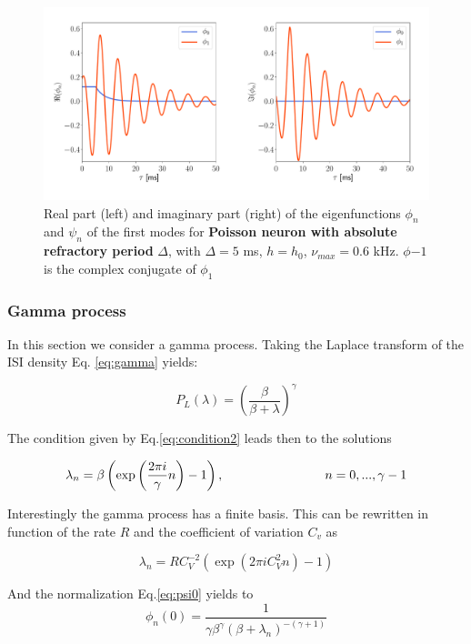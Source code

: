 \documentclass[12pt,twoside]{report}
\begin{document}
\begin{figure}[h!]
	\centering
	\includegraphics[width=0.8\linewidth]{poisson_eigenfunction2.pdf}
	\caption{Real part (left) and imaginary part (right) of the eigenfunctions $\phi_n$ and $\psi_n$ of the first modes for \textbf{Poisson neuron with absolute refractory period} $\Delta$, with $\Delta=5$ ms, $h=h_0$, $\nu_{max}=0.6$ kHz. $\phi{-1}$ is the complex conjugate of $\phi_{1}$}
	\label{fig:poissoneigenfunction}
\end{figure}


\subsubsection{Gamma process}

In this section we consider a gamma process. Taking the Laplace transform of the ISI density Eq. \eqref{eq:gamma} yields:

\begin{equation}
P_L(\lambda)=\left(\frac{\beta}{\beta +\lambda}\right)^\gamma
\end{equation}

The condition given by Eq.\eqref{eq:condition2} leads then to the solutions

\begin{equation}
\lambda_n=\beta\left(\exp\left(\frac{2\pi i}{\gamma}n\right)-1\right), \hspace{2.8cm}  n=0,..., \gamma-1
\end{equation}

Interestingly the gamma process has a finite basis. This can be rewritten in function of the rate $R$ and the coefficient of variation $C_v$ as

\begin{equation}
\lambda_n=RC_V^{-2}\left(\exp\left(2\pi iC_V^2 n\right)-1\right)
\end{equation}

And the normalization Eq.\ref{eq:psi0} yields to
\begin{equation}
\phi_n(0)=\frac{1}{\gamma\beta^\gamma(\beta+\lambda_n)^{-(\gamma+1)}}
\end{equation}
\end{document}
